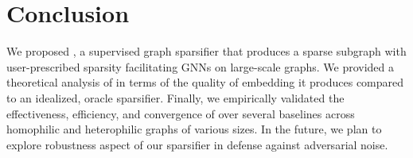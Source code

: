 \section{Conclusion}


We proposed \sgs, a supervised graph sparsifier that produces a sparse subgraph with user-prescribed sparsity facilitating GNNs on large-scale graphs. We provided a theoretical analysis of \sgs in terms of the quality of embedding it produces compared to an idealized, oracle sparsifier. Finally, we empirically validated the effectiveness, efficiency, and convergence of \sgs over several baselines across homophilic and heterophilic graphs of various sizes. In the future, we plan to explore 
robustness aspect of our sparsifier in defense against adversarial noise.

